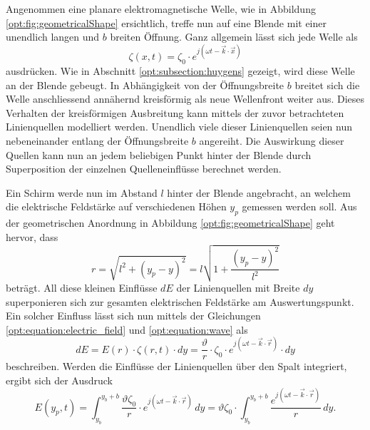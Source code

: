 Angenommen eine planare elektromagnetische Welle, wie in Abbildung \ref{opt:fig:geometricalShape} ersichtlich, treffe nun auf eine Blende mit einer unendlich langen und $b$ breiten Öffnung.
Ganz allgemein lässt sich jede Welle als
\begin{equation}
\zeta(x, t)
=
\zeta_0 \cdot e^{j(\omega t - \vec{k}\cdot\vec{x})}
\label{opt:equation:wave}
\end{equation}
ausdrücken.
Wie in Abschnitt \ref{opt:subsection:huygens} gezeigt, wird diese Welle an der Blende gebeugt.
In Abhängigkeit von der Öffnungsbreite $b$ breitet sich die Welle anschliessend annähernd kreisförmig als neue Wellenfront weiter aus.
Dieses Verhalten der kreisförmigen Ausbreitung kann mittels der zuvor betrachteten Linienquellen modelliert werden.
Unendlich viele dieser Linienquellen seien nun nebeneinander entlang der Öffnungsbreite $b$ angereiht.
Die Auswirkung dieser Quellen kann nun an jedem beliebigen Punkt hinter der Blende durch Superposition der einzelnen Quelleneinflüsse berechnet werden.

Ein Schirm werde nun im Abstand $l$ hinter der Blende angebracht, an welchem die elektrische Feldstärke auf verschiedenen Höhen $y_p$ gemessen werden soll.
Aus der geometrischen Anordnung in Abbildung \ref{opt:fig:geometricalShape} geht hervor, dass
\begin{equation}
r
=
\sqrt{l^2 + (y_p-y)^2}
=
l \sqrt{1 + \frac{(y_p-y)^2}{l^2}}
\label{opt:equation:distance_r}
\end{equation}
beträgt. All diese kleinen Einflüsse $dE$ der Linienquellen mit Breite $dy$ superponieren sich zur gesamten elektrischen Feldstärke am Auswertungspunkt.
Ein solcher Einfluss lässt sich nun mittels der Gleichungen \eqref{opt:equation:electric_field} und \eqref{opt:equation:wave} als
\begin{equation*}
dE
=
E(r) \cdot \zeta(r, t) \cdot dy
=
\frac{\vartheta}{r} \cdot \zeta_0 \cdot e^{j(\omega t - \vec{k}\cdot\vec{r})} \cdot dy
\end{equation*}
beschreiben.
Werden die Einflüsse der Linienquellen über den Spalt integriert, ergibt sich der Ausdruck
\begin{equation*}
E(y_p, t)
=
\int_{y_b}^{y_b+b}\frac{\vartheta\zeta_0}{r} \cdot e^{j(\omega t - \vec{k}\cdot\vec{r})} \,dy
=
\vartheta\zeta_0 \cdot \int_{y_b}^{y_b+b}\frac{e^{j(\omega t - \vec{k}\cdot\vec{r})}}{r} \,dy
.
\end{equation*}

